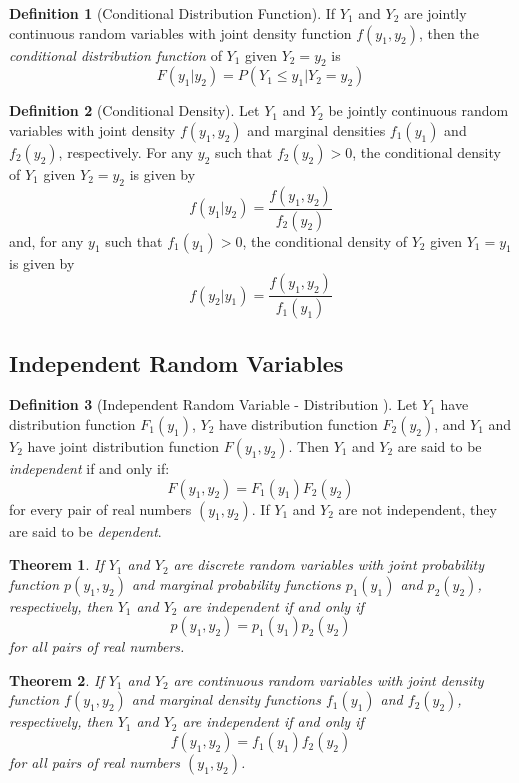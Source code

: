 \documentclass{article}
\theoremstyle{plain}
\newtheorem{thm}{Theorem}[section]
\theoremstyle{definition}
\newtheorem{defn}{Definition}[section]
\theoremstyle{remark}
\begin{document}
\begin{defn}[Conditional Distribution Function]
If $Y_1$ and $Y_2$ are jointly continuous random variables with joint density function $f(y_1, y_2)$, then the \textit{conditional distribution function} of $Y_1$ given $Y_2 = y_2$ is
$$
F(y_1|y_2) = P(Y_1 \leq y_1|Y_2 = y_2)
$$
\end{defn}

\begin{defn}[Conditional Density]
Let $Y_1$ and $Y_2$ be jointly continuous random variables with joint density $f(y_1, y_2)$ and marginal densities $f_1(y_1)$ and $f_2(y_2)$, respectively. For any $y_2$ such that $f_2(y_2) > 0$, the conditional density of $Y_1$ given $Y_2 = y_2$ is given by
$$
f(y_1|y_2) = \frac{f(y_1,y_2)}{f_2(y_2)}
$$
and, for any $y_1$ such that $f_1(y_1) > 0$, the conditional density of $Y_2$ given $Y_1 = y_1$ is given by
$$
f(y_2|y_1) = \frac{f(y_1,y_2)}{f_1(y_1)}
$$
\end{defn}
\subsection{Independent Random Variables}
\begin{defn}[Independent Random Variable - Distribution ]
  Let $Y_1$ have distribution function $F_1(y_1)$, $Y_2$ have distribution function $F_2(y_2)$, and $Y_1$ and $Y_2$ have joint distribution function $F(y_1,y_2)$. Then $Y_1$ and $Y_2$ are said to be \textit{independent} if and only if:
$$
F(y_1,y_2) = F_1(y_1)F_2(y_2)
$$
for every pair of real numbers $(y_1,y_2)$. If $Y_1$ and $Y_2$ are not independent, they are said to be \textit{dependent}. 
\end{defn}

\begin{thm}
If $Y_1$ and $Y_2$ are discrete random variables with joint probability function $p(y_1, y_2)$ and marginal probability functions $p_1(y_1)$ and $p_2(y_2)$, respectively, then $Y_1$ and $Y_2$ are independent if and only if
$$
p(y_1,y_2) = p_1(y_1)p_2(y_2)
$$
for all pairs of real numbers.
\end{thm}
\begin{thm}
If $Y_1$ and $Y_2$ are continuous random variables with joint density function $f(y_1, y_2)$ and marginal density functions $f_1(y_1)$ and $f_2(y_2)$, respectively, then $Y_1$ and $Y_2$ are independent if and only if
$$
f(y_1, y_2) = f_1(y_1) f_2(y_2)
$$
for all pairs of real numbers $(y_1,y_2)$.
\end{thm}
\end{document}
